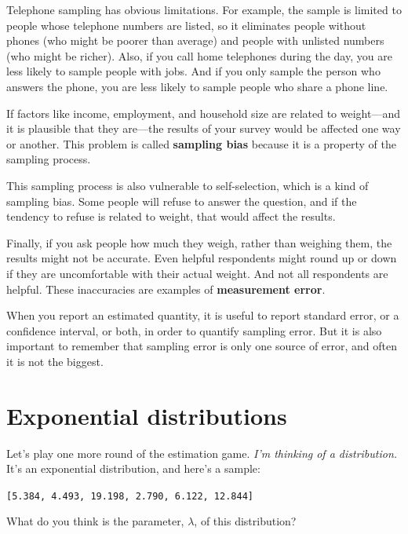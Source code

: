 \documentclass[12pt]{book}
\begin{document}
Telephone sampling has obvious limitations.  For example, the sample
is limited to people whose telephone numbers are listed, so it
eliminates people without phones (who might be poorer than average)
and people with unlisted numbers (who might be richer).  Also, if you
call home telephones during the day, you are less likely to sample
people with jobs.  And if you only sample the person who answers the
phone, you are less likely to sample people who share a phone line.

If factors like income, employment, and household size are related
to weight---and it is plausible that they are---the results of your
survey would be affected one way or another.  This problem is
called {\bf sampling bias} because it is a property of the sampling
process.

This sampling process is also vulnerable to self-selection, which is a
kind of sampling bias.  Some people will refuse to answer the
question, and if the tendency to refuse is related to weight, that
would affect the results.

Finally, if you ask people how much they weigh, rather than weighing
them, the results might not be accurate.  Even helpful respondents
might round up or down if they are uncomfortable with their actual
weight.  And not all respondents are helpful.  These inaccuracies are
examples of {\bf measurement error}.

When you report an estimated quantity, it is useful to report
standard error, or a confidence interval, or both, in order to
quantify sampling error.  But it is also important to remember that
sampling error is only one source of error, and often it is not the
biggest.


\section{Exponential distributions}

Let's play one more round of the estimation game.
{\em I'm thinking of a distribution.\/}  It's an exponential distribution, and 
here's a sample:

\verb"[5.384, 4.493, 19.198, 2.790, 6.122, 12.844]"

What do you think is the parameter, $\lambda$, of this distribution?
\end{document}
